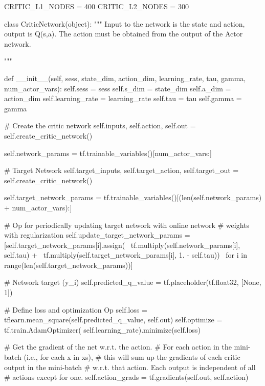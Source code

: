 \begin{python}[caption={Critic Network Class},label={list:critic_net}]
CRITIC_L1_NODES = 400
CRITIC_L2_NODES = 300

class CriticNetwork(object):
    """
    Input to the network is the state and action, output is Q(s,a).
    The action must be obtained from the output of the Actor network.

    """

    def __init__(self, sess, state_dim, action_dim, learning_rate, tau, gamma, num_actor_vars):
        self.sess = sess
        self.s_dim = state_dim
        self.a_dim = action_dim
        self.learning_rate = learning_rate
        self.tau = tau
        self.gamma = gamma

        # Create the critic network
        self.inputs, self.action, self.out = self.create_critic_network()

        self.network_params = tf.trainable_variables()[num_actor_vars:]

        # Target Network
        self.target_inputs, self.target_action, self.target_out = self.create_critic_network()

        self.target_network_params = tf.trainable_variables()[(len(self.network_params) + num_actor_vars):]

        # Op for periodically updating target network with online network
        # weights with regularization
        self.update_target_network_params = [self.target_network_params[i].assign( \
            tf.multiply(self.network_params[i], self.tau) + \
            tf.multiply(self.target_network_params[i], 1. - self.tau)) \
                for i in range(len(self.target_network_params))]

        # Network target (y_i)
        self.predicted_q_value = tf.placeholder(tf.float32, [None, 1])

        # Define loss and optimization Op
        self.loss = tflearn.mean_square(self.predicted_q_value, self.out)
        self.optimize = tf.train.AdamOptimizer(
            self.learning_rate).minimize(self.loss)

        # Get the gradient of the net w.r.t. the action.
        # For each action in the mini-batch (i.e., for each x in xs),
        # this will sum up the gradients of each critic output in the mini-batch
        # w.r.t. that action. Each output is independent of all
        # actions except for one.
        self.action_grads = tf.gradients(self.out, self.action)


\end{python}
